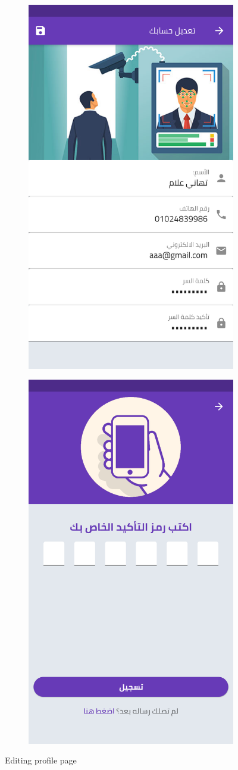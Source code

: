 \begin{figure}[H] 
  
  \begin{subfigure}[b]{0.5\linewidth}
    \centering
    \includegraphics[width=0.5\linewidth]{images/ch3/Profile/1.png}
  
    \label{fig7:a} 
  \end{subfigure}%
    \begin{subfigure}[b]{0.5\linewidth}
    \centering
    \includegraphics[width=0.5\linewidth]{images/ch3/Profile/2.png}
  
    \label{fig7:b} 
  \end{subfigure}%
  \caption{ Editing profile page}
  \label{fig7} 
\end{figure}


